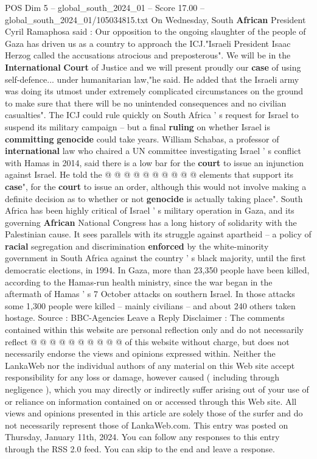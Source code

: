 \begin{textsample}{POS Dim 5 – global\_south\_2024\_01 – Score 17.00 – global\_south\_2024\_01/105034815.txt}
On Wednesday, South \textbf{African} President Cyril Ramaphosa said : Our opposition to the ongoing slaughter of the people of Gaza has driven us as a country to approach the ICJ."Israeli President Isaac Herzog called the accusations atrocious and preposterous".
We will be in the \textbf{International} \textbf{Court} of Justice and we will present proudly our \textbf{case} of using self-defence... under humanitarian law,"he said.
He added that the Israeli army was doing its utmost under extremely complicated circumstances on the ground to make sure that there will be no unintended consequences and no civilian casualties".
The ICJ could rule quickly on South Africa ' s request for Israel to suspend its military campaign -- but a final \textbf{ruling} on whether Israel is \textbf{committing} \textbf{genocide} could take years.
William Schabas, a professor of \textbf{international} law who chaired a UN committee investigating Israel ' s conflict with Hamas in 2014, said there is a low bar for the \textbf{court} to issue an injunction against Israel.
He told the @ @ @ @ @ @ @ @ @ @ elements that support its \textbf{case}", for the \textbf{court} to issue an order, although this would not involve making a definite decision as to whether or not \textbf{genocide} is actually taking place".
South Africa has been highly critical of Israel ' s military operation in Gaza, and its governing \textbf{African} National Congress has a long history of solidarity with the Palestinian cause.
It sees parallels with its struggle against apartheid -- a policy of \textbf{racial} segregation and discrimination \textbf{enforced} by the white-minority government in South Africa against the country ' s black majority, until the first democratic elections, in 1994.
In Gaza, more than 23,350 people have been killed, according to the Hamas-run health ministry, since the war began in the aftermath of Hamas ' s 7 October attacks on southern Israel.
In those attacks some 1,300 people were killed -- mainly civilians -- and about 240 others taken hostage.
Source : BBC-Agencies Leave a Reply Disclaimer : The comments contained within this website are personal reflection only and do not necessarily reflect @ @ @ @ @ @ @ @ @ @ of this website without charge, but does not necessarily endorse the views and opinions expressed within.
Neither the LankaWeb nor the individual authors of any material on this Web site accept responsibility for any loss or damage, however caused ( including through negligence ), which you may directly or indirectly suffer arising out of your use of or reliance on information contained on or accessed through this Web site.
All views and opinions presented in this article are solely those of the surfer and do not necessarily represent those of LankaWeb.com.
This entry was posted on Thursday, January 11th, 2024.
You can follow any responses to this entry through the RSS 2.0 feed.
You can skip to the end and leave a response.

\end{textsample}
